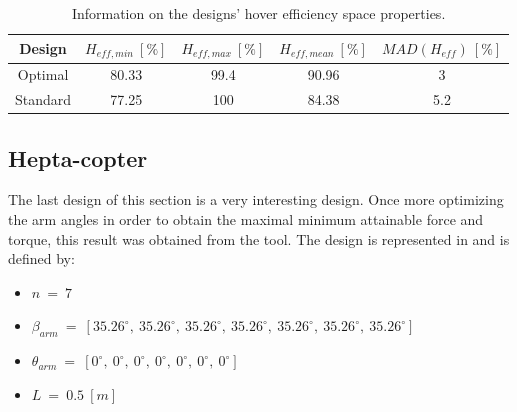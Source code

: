 \begin{table}[!ht]
\begin{center}
 \caption{Information on the designs’ hover efficiency space properties.}\vspace{1ex}
 \label{tab:tab_Penta_compare_hover}
  {\tiny\begin{tabular}{|c|cccc|}
 \hline
  Design & $H_{eff,min}\ [\%]$ & $H_{eff,max}\ [\%]$ & $H_{eff,mean}\ [\%]$
  & $MAD(H_{eff})\ [\%]$\\ \hline
  Optimal & 80.33 & 99.4 & 90.96 & 3\\
  Standard & 77.25 & 100 & 84.38 & 5.2\\
 \hline
\end{tabular}}
\end{center}
\end{table}

\subsection{Hepta-copter}
\label{sec:hepta_copter}

The last design of this section is a very interesting design. Once more optimizing
the arm angles in order to obtain the maximal minimum attainable force and torque,
this result was obtained from the tool. The design is represented in
and is defined by:

{\small\begin{itemize}
  \item $n\ =\ 7$
  \item $\beta_{arm}\ =\ [35.26^{\circ},\  35.26^{\circ},\  35.26^{\circ},\  35.26^{\circ},\
                          35.26^{\circ},\  35.26^{\circ},\  35.26^{\circ}]$
  \item $\theta_{arm}\ =\ [0^{\circ},\  0^{\circ},\  0^{\circ},\  0^{\circ},\  0^{\circ},\
                            0^{\circ},\  0^{\circ}]$
  \item $L\ =\ 0.5\ [m]$
\end{itemize}}

